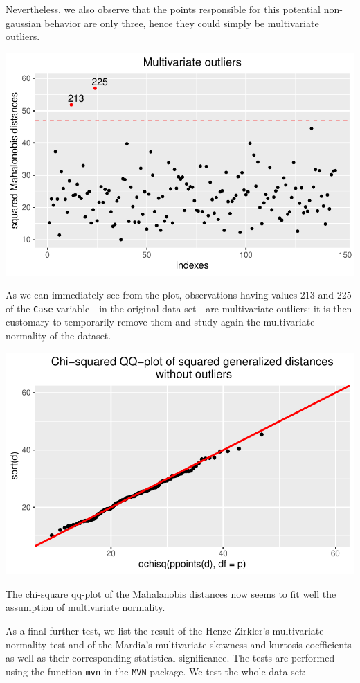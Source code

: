 \documentclass[
  letterpaper,
  DIV=11,
  numbers=noendperiod]{scrartcl}
\begin{document}
Nevertheless, we also observe that the points responsible for this
potential non-gaussian behavior are only three, hence they could simply
be multivariate outliers.

\includegraphics{ProblemSet2_files/figure-pdf/unnamed-chunk-10-1.pdf}

As we can immediately see from the plot, observations having values 213
and 225 of the \texttt{Case} variable - in the original data set - are
multivariate outliers: it is then customary to temporarily remove them
and study again the multivariate normality of the dataset.

\includegraphics{ProblemSet2_files/figure-pdf/unnamed-chunk-11-1.pdf}

The chi-square qq-plot of the Mahalanobis distances now seems to fit
well the assumption of multivariate normality.

As a final further test, we list the result of the Henze-Zirkler's
multivariate normality test and of the Mardia's multivariate skewness
and kurtosis coefficients as well as their corresponding statistical
significance. The tests are performed using the function \texttt{mvn} in
the \texttt{MVN} package. We test the whole data set:
\end{document}
